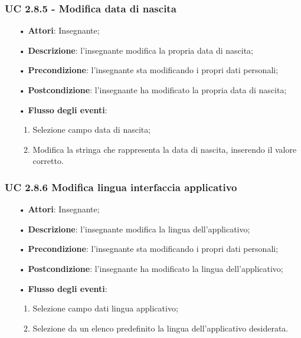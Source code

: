 \subsubsection{UC 2.8.5 - Modifica data di nascita}
\begin{itemize}
	\item[•]\textbf{Attori}: Insegnante;
	\item[•]\textbf{Descrizione}: l'insegnante modifica la propria data di nascita;
	\item[•]\textbf{Precondizione}: l'insegnante sta modificando i propri dati personali;
	\item[•]\textbf{Postcondizione}: l'insegnante ha modificato la propria data di nascita; 
	\item[•]\textbf{Flusso degli eventi}: 
	\begin{enumerate}
		\item Selezione campo data di nascita;
		\item Modifica la stringa che rappresenta la data di nascita, inserendo il valore corretto.
	\end{enumerate}
\end{itemize}

\subsubsection{UC 2.8.6 Modifica lingua interfaccia applicativo}
\begin{itemize}
	\item[•]\textbf{Attori}: Insegnante;
	\item[•]\textbf{Descrizione}: l'insegnante modifica la lingua dell'applicativo;
	\item[•]\textbf{Precondizione}: l'insegnante sta modificando i propri dati personali;
	\item[•]\textbf{Postcondizione}: l'insegnante ha modificato la lingua dell'applicativo; 
	\item[•]\textbf{Flusso degli eventi}: 
	\begin{enumerate}
		\item Selezione campo dati lingua applicativo;
		\item Selezione da un elenco predefinito la lingua dell'applicativo desiderata.
	\end{enumerate}
\end{itemize}


